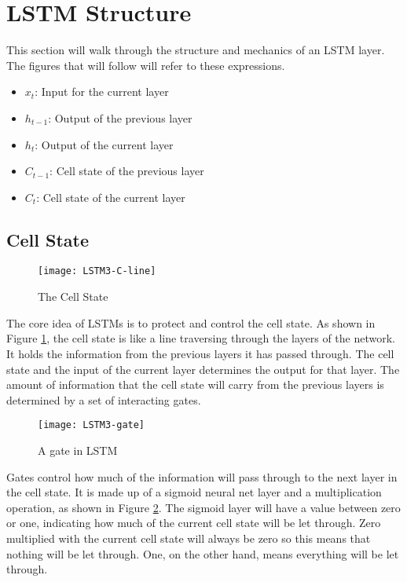 \section{LSTM Structure}
    This section will walk through the structure and mechanics of an LSTM layer. The figures that will follow will refer to these expressions.
        \begin{itemize}
        \item \( x_t \): Input for the current layer
        \item \( h_{t-1} \): Output of the previous layer
        \item \( h_t \): Output of the current layer
        \item \( C_{t-1} \): Cell state of the previous layer
        \item \( C_t \): Cell state of the current layer
        \end{itemize}

    \subsection{Cell State}
        \begin{figure}[H]
        \centering
        \texttt{[image: LSTM3-C-line]}
        \caption{The Cell State \citep{olah2015understanding}}
        \label{fig:cell-state}
        \end{figure}
        The core idea of LSTMs is to protect and control the cell state. As shown in Figure \ref{fig:cell-state}, the cell state is like a line traversing through the layers of the network. It holds the information from the previous layers it has passed through. The cell state and the input of the current layer determines the output for that layer. The amount of information that the cell state will carry from the previous layers is determined by a set of interacting gates.

        \begin{figure}[H]
        \centering
        \texttt{[image: LSTM3-gate]}
        \caption{A gate in LSTM \citep{olah2015understanding}}
        \label{fig:lstm-gate}
        \end{figure}
        Gates control how much of the information will pass through to the next layer in the cell state. It is made up of a sigmoid neural net layer and a multiplication operation, as shown in Figure \ref{fig:lstm-gate}. The sigmoid layer will have a value between zero or one, indicating how much of the current cell state will be let through. Zero multiplied with the current cell state will always be zero so this means that nothing will be let through. One, on the other hand, means everything will be let through.

